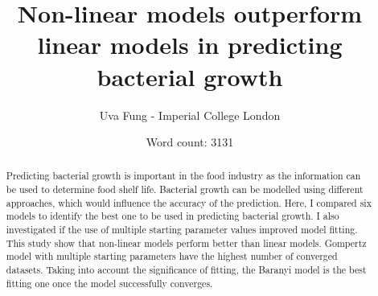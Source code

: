 \documentclass[11pt]{article}
\title{Non-linear models outperform linear models in predicting bacterial growth}
\author{Uva Fung - Imperial College London}
\date{Word count: 3131}
\begin{document}
\begin{titlepage}
\maketitle
\end{titlepage}



\begin{abstract}
Predicting bacterial growth is important in the food industry as the information can be used to determine food shelf life. Bacterial growth can be modelled using different approaches, which would influence the accuracy of the prediction. Here, I compared six models to identify the best one to be used in predicting bacterial growth. I also investigated if the use of multiple starting parameter values improved model fitting. This study show that non-linear models perform better than linear models. Gompertz model with multiple starting parameters have the highest number of converged datasets. Taking into account the significance of fitting, the Baranyi model is the best fitting one once the model successfully converges. 
\end{abstract} 
\end{document}
